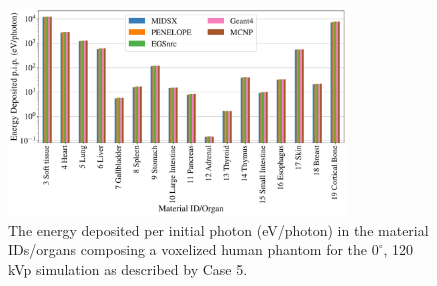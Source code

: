 
\begin{figure}[htbp]
    \centering
	\includegraphics[width=0.8\textwidth]{../figures/CT_120_0.pdf}
	\caption{The energy deposited per initial photon (eV/photon) in the material IDs/organs composing a voxelized human phantom for the $0^\circ$, 120 kVp simulation as described by Case 5.}
	\label{fig:CTGraph}
\end{figure}

\FloatBarrier
